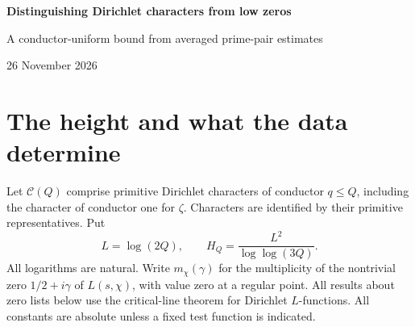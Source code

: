 \documentclass[11pt,letterpaper]{article}
\begin{document}
\thispagestyle{plain}
\begin{center}
{\Large\bfseries Distinguishing Dirichlet characters from low zeros}\par
\vspace{5pt}
{\large A conductor-uniform bound from averaged prime-pair estimates}\par
\vspace{9pt}
{\small 26 November 2026}
\end{center}
\begin{abstract}
Let $Q\ge3$. Using Dirichlet GRH, we prove that the positive zero ordinates up to $C\log^2(2Q)/\log\log(3Q)$, counted with multiplicity, identify every primitive character of conductor at most $Q$, of arbitrary order. At this height distinct characters have $\gg\log(2Q)$ unmatched zero occurrences, even if matching allows a displacement of $c/\log^2(2Q)$. Folding the full signed spectrum by $\gamma\mapsto|\gamma|$ identifies the character up to conjugation. The proof constructs $O(\log Q)$ common prime evaluations which separate all pairs with a fixed margin. A smooth explicit-formula probe reads each evaluation to fixed accuracy. An upper-bound sieve controls the total contribution of nearby prime powers averaged over the probe primes. This permits frequency resolution on the scale of the mean prime spacing. The result answers the finite-height questions for quadratic and complex characters in the ProveIt article.
\end{abstract}

\section{The height and what the data determine}
Let $\mathcal C(Q)$ comprise primitive Dirichlet characters of conductor $q\le Q$, including the character of conductor one for $\zeta$. Characters are identified by their primitive representatives. Put
\[
 L=\log(2Q),\qquad H_Q=\frac{L^2}{\log\log(3Q)} .
\]
All logarithms are natural. Write $m_\chi(\gamma)$ for the multiplicity of the nontrivial zero $1/2+i\gamma$ of $L(s,\chi)$, with value zero at a regular point. All results about zero lists below use the critical-line theorem for Dirichlet $L$-functions. All constants are absolute unless a fixed test function is indicated.
\end{document}
